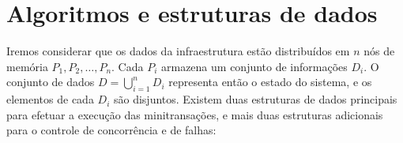 \documentclass[11pt,twoside,a4paper]{book}
\begin{document}


\section{Algoritmos e estruturas de dados}
\label{sec:algoritmos}

Iremos considerar que os dados da infraestrutura estão distribuídos em $n$ nós de memória $P_1, P_2, \dotsc, P_n$. Cada $P_i$ armazena um conjunto de informações $D_i$. O conjunto de dados $D = \bigcup_{i=1}^n D_i$ representa então o estado do sistema, e os elementos de cada $D_i$ são disjuntos. Existem duas estruturas de dados principais para efetuar a execução das minitransações, e mais duas estruturas adicionais para o controle de concorrência e de falhas:

\end{document}
